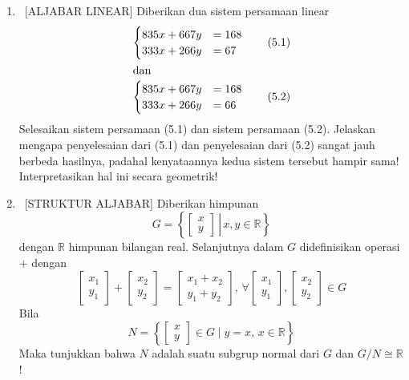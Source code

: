 \documentclass[10pt,a4paper]{article}
\begin{document}
\begin{enumerate}
  \item \ [ALJABAR LINEAR] Diberikan dua sistem persamaan linear
        \begin{align}
          \begin{cases}
            835x + 667y & = 168 \\
            333x + 266y & = 67
          \end{cases} \tag{5.1} \\
          \intertext{dan}
          \begin{cases}
            835x + 667y & = 168 \\
            333x + 266y & = 66
          \end{cases} \tag{5.2}
        \end{align}
        Selesaikan sistem persamaan (5.1) dan sistem persamaan (5.2). Jelaskan mengapa penyelesaian dari (5.1) dan penyelesaian dari (5.2) sangat jauh berbeda hasilnya, padahal kenyataannya kedua sistem tersebut hampir sama! Interpretasikan hal ini secara geometrik!

  \item \ [STRUKTUR ALJABAR] Diberikan himpunan
        \[ G = \left\{ \left. \begin{bmatrix} x \\ y \end{bmatrix} \,\right|\, x, y \in \mathbb{R} \right\} \]
        dengan $\mathbb{R}$ himpunan bilangan real. Selanjutnya dalam $G$ didefinisikan operasi $+$ dengan
        \[ \begin{bmatrix} x_1 \\ y_1 \end{bmatrix} + \begin{bmatrix} x_2 \\ y_2 \end{bmatrix} = \begin{bmatrix} x_1 + x_2 \\ y_1 + y_2 \end{bmatrix},\,\forall  \begin{bmatrix} x_1 \\ y_1 \end{bmatrix}, \begin{bmatrix} x_2 \\ y_2 \end{bmatrix} \in G \]
        Bila
        \[ N = \left\{ \begin{bmatrix} x \\ y \end{bmatrix} \in G \mid y = x,\, x \in \mathbb{R} \right\} \]
        Maka tunjukkan bahwa $N$ adalah suatu subgrup normal dari $G$ dan $G/N \cong \mathbb{R}$ !

\end{enumerate}
\end{document}
